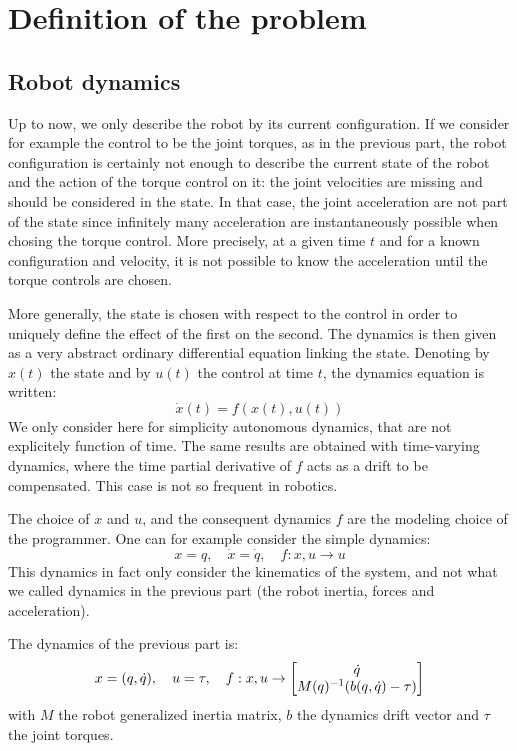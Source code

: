 \documentclass{book}
\begin{document}
\section{Definition of the problem}

\subsection{Robot dynamics}

Up to now, we only describe the robot by its current configuration. If we consider for example the control to be the joint torques, as in the previous part, the robot configuration is certainly not enough to describe the current state of the robot and the action of the torque control on it: the joint velocities are missing and should be considered in the state. In that case, the joint acceleration are not part of the state since infinitely many acceleration are instantaneously possible when chosing the torque control. More precisely, at a given time $t$ and for a known configuration and velocity, it is not possible to know the acceleration until the torque controls are chosen. 

More generally, the state is chosen with respect to the control in order to uniquely define the effect of the first on the second. The dynamics is then given as a very abstract ordinary differential equation linking the state. Denoting by $x(t)$ the state and by $u(t)$ the control at time $t$, the dynamics equation is written:
$$ \dot x(t) = f(x(t),u(t)) $$
We only consider here for simplicity autonomous dynamics, \mie that are not explicitely function of time. The same results are obtained with time-varying dynamics, where the time partial derivative of $f$ acts as a drift to be compensated. This case is not so frequent in robotics.

The choice of $x$ and $u$, and the consequent dynamics $f$ are the modeling choice of the programmer. One can for example consider the simple dynamics:
$$ x = q, \quad \dot x = \dot q, \quad f: x,u \rightarrow u$$
This dynamics in fact only consider the kinematics of the system, and not what we called dynamics in the previous part (the robot inertia, forces and acceleration).

The dynamics of the previous part is:
$$ x = (q,\dot q), \quad u = \tau, \quad f: x,u \rightarrow \begin{bmatrix} \dot q \\ M(q)^{-1} (b(q,\dot q) - \tau) \end{bmatrix}$$
with $M$ the robot generalized inertia matrix, $b$ the dynamics drift vector and $\tau$ the joint torques.
\end{document}
